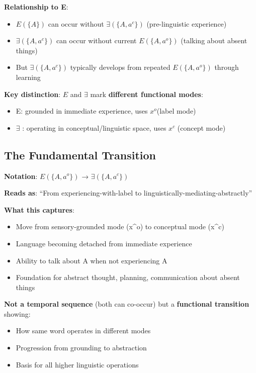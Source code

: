 \documentclass[12pt]{article}
\providecommand{\tightlist}{}   %
\begin{document}
\textbf{Relationship to E}:

\begin{itemize}
\tightlist
\item
  \(E(\{A\})\) can occur without \(\exists(\{A, a^c\})\) (pre-linguistic experience)
\item
  \(\exists(\{A, a^c\})\) can occur without current \(E(\{A, a^o\})\) (talking about absent things)
\item
  But \(\exists(\{A, a^c\})\) typically develops from repeated \(E(\{A, a^o\})\) through learning
\end{itemize}

\textbf{Key distinction}: \(E\) and \(\exists\) mark \textbf{different functional modes}:

\begin{itemize}
\tightlist
\item
  E: grounded in immediate experience, uses \(x^o\)(label mode)
\item
  \(\exists\) : operating in conceptual/linguistic space, uses \(x^c\) (concept mode)
\end{itemize}

\subsection{The Fundamental Transition}\label{the-fundamental-transition}

\textbf{Notation}: \(E(\{A, a^o\})\) → \(\exists(\{A, a^c\})\)

\textbf{Reads as}: ``From experiencing-with-label to linguistically-mediating-abstractly''

\textbf{What this captures}:

\begin{itemize}
\tightlist
\item
  Move from sensory-grounded mode (x\^{}o) to conceptual mode (x\^{}c)
\item
  Language becoming detached from immediate experience
\item
  Ability to talk about A when not experiencing A
\item
  Foundation for abstract thought, planning, communication about absent things
\end{itemize}

\textbf{Not a temporal sequence} (both can co-occur) but a \textbf{functional transition} showing:

\begin{itemize}
\tightlist
\item
  How same word operates in different modes
\item
  Progression from grounding to abstraction
\item
  Basis for all higher linguistic operations
\end{itemize}
\end{document}
